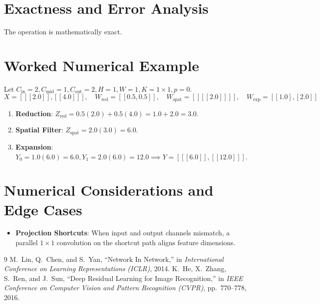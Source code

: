\documentclass[11pt,a4paper]{article}
\theoremstyle{definition}
\begin{document}
\section{Exactness and Error Analysis}

The operation is mathematically exact.

\section{Worked Numerical Example}

Let $C_{\text{in}} = 2, C_{\text{mid}} = 1, C_{\text{out}} = 2, H = 1, W = 1, K = 1 \times 1, p = 0$.
\begin{equation}
X = [[[2.0]], [[4.0]]], \quad W_{\text{red}} = [[0.5, 0.5]], \quad W_{\text{spat}} = [[[[2.0]]]], \quad W_{\text{exp}} = [[1.0], [2.0]]
\end{equation}

\begin{enumerate}
    \item \textbf{Reduction}:
    $Z_{\text{red}} = 0.5(2.0) + 0.5(4.0) = 1.0 + 2.0 = 3.0$.
    \item \textbf{Spatial Filter}:
    $Z_{\text{spat}} = 2.0(3.0) = 6.0$.
    \item \textbf{Expansion}:
    $Y_0 = 1.0(6.0) = 6.0, Y_1 = 2.0(6.0) = 12.0 \implies Y = [[[6.0]], [[12.0]]]$.
\end{enumerate}

\section{Numerical Considerations and Edge Cases}

\begin{itemize}
    \item \textbf{Projection Shortcuts}: When input and output channels mismatch, a parallel $1 \times 1$ convolution on the shortcut path aligns feature dimensions.
\end{itemize}

\begin{thebibliography}{9}
 M.~Lin, Q.~Chen, and S.~Yan, ``Network In Network,'' in \emph{International Conference on Learning Representations (ICLR)}, 2014.
 K.~He, X.~Zhang, S.~Ren, and J.~Sun, ``Deep Residual Learning for Image Recognition,'' in \emph{IEEE Conference on Computer Vision and Pattern Recognition (CVPR)}, pp.~770--778, 2016.
\end{thebibliography}
\end{document}
